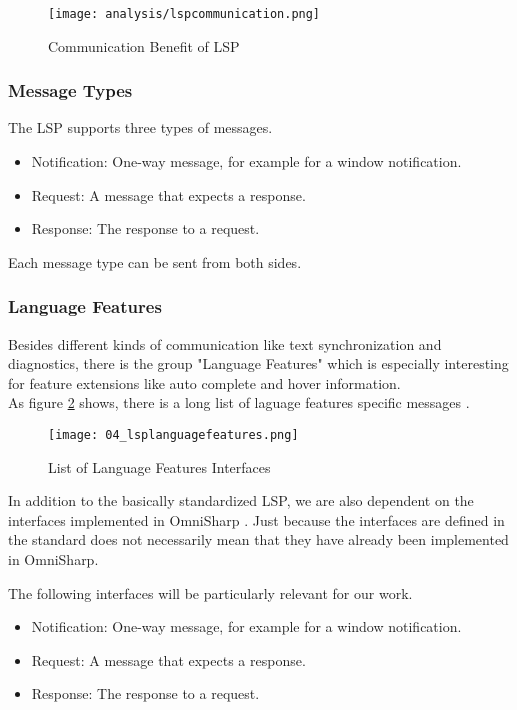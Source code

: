 \begin{figure}[h]
    \centering
    \texttt{[image: analysis/lspcommunication.png]}
    \caption{Communication Benefit of LSP}
    \label{fig:lspcommunication}
\end{figure}

\subsubsection{Message Types}
The LSP supports three types of messages.
\begin{itemize}
    \item Notification: One-way message, for example for a window notification.
    \item Request: A message that expects a response.
    \item Response: The response to a request.
\end{itemize}
Each message type can be sent from both sides.

\subsubsection{Language Features}
Besides different kinds of communication
like text synchronization and diagnostics,
there is the group "Language Features" which is especially interesting
for feature extensions like auto complete and hover information. \\

As figure \ref{fig:lsplanguagefeatures} shows, there is a long list of laguage features specific messages \cite{lspspec}.

\begin{figure}[H]
    \centering
    \texttt{[image: 04\_lsplanguagefeatures.png]}
    \caption{List of Language Features Interfaces}
    \label{fig:lsplanguagefeatures}
\end{figure}

In addition to the basically standardized LSP, we are also dependent on the interfaces implemented in OmniSharp \cite{lspspec}.
Just because the interfaces are defined in the standard does not necessarily mean that they have already been implemented in OmniSharp.

The following interfaces will be particularly relevant for our work.
\begin{itemize}
    \item Notification: One-way message, for example for a window notification.
    \item Request: A message that expects a response.
    \item Response: The response to a request.
\end{itemize}

